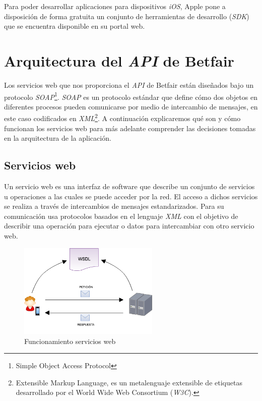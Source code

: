  Para poder desarrollar aplicaciones para dispositivos \emph{iOS}, Apple pone a disposición de forma gratuita un conjunto de herramientas de desarrollo (\emph{SDK}) que se encuentra disponible en su portal web. 

\section{Arquitectura del \emph{API} de Betfair}

	Los servicios web que nos proporciona el \emph{API} de Betfair están diseñados bajo un protocolo \emph{SOAP}\footnote{Simple Object Access Protocol}. \emph{SOAP} es un protocolo estándar que define cómo dos objetos en diferentes procesos pueden comunicarse por medio de intercambio de mensajes, en este caso codificados en \emph{XML}\footnote{Extensible Markup Language, es un metalenguaje extensible de etiquetas desarrollado por el World Wide Web Consortium (\emph{W3C}).}. A continuación explicaremos qué son y cómo funcionan los servicios web para más adelante comprender las decisiones tomadas en la arquitectura de la aplicación.


\subsection{Servicios web}

         Un servicio web es una interfaz de software que describe un conjunto de servicios u operaciones a las cuales se puede acceder por la red. El acceso a dichos servicios se realiza a través de intercambios de mensajes estandarizados. Para su comunicación usa protocolos basados en el lenguaje \emph{XML} con el objetivo de describir una operación para ejecutar o datos para intercambiar con otro servicio web.  
 
\begin{figure} [h]
  \centering
    \includegraphics[width=0.6\textwidth]{./images/webservice.png}
  \caption{Funcionamiento servicios web}
  \label{fig:servicioweb}
\end{figure}
         
